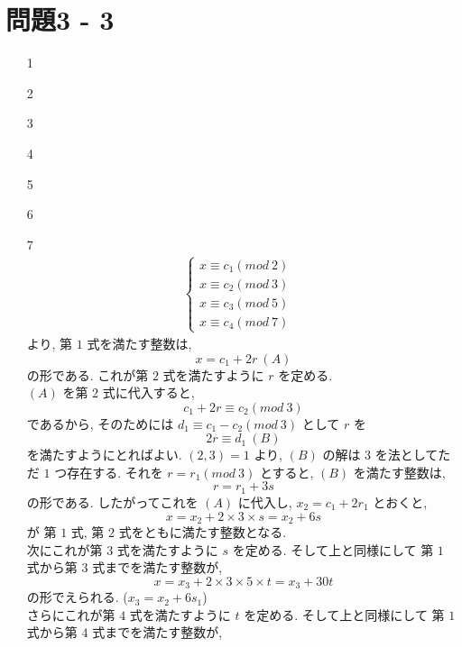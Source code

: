 \documentclass[12pt,a4paper]{jsarticle}
\begin{document}
\section*{問題3 - 3}
\begin{enumerate}
 \item[1]  \mbox{} \\
 \item[2]  \mbox{} \\
 \item[3]  \mbox{} \\
 \item[4]  \mbox{} \\
 \item[5]  \mbox{} \\
 \item[6]  \mbox{} \\
 \item[7]  \mbox{} \\
 \begin{align*}
  \begin{cases}
  x \equiv c_1 (mod~2) & \\
  x \equiv c_2 (mod~3) & \\
  x \equiv c_3 (mod~5) & \\
  x \equiv c_4 (mod~7)
  \end{cases}
 \end{align*}
 より, 第 $1$ 式を満たす整数は,
 \[ x = c_1 + 2r~ (A) \]
 の形である. これが第 $2$ 式を満たすように $r$ を定める. \\
 $(A)$ を第 $2$ 式に代入すると,
 \[ c_1 + 2r \equiv c_2 (mod~3) \] 
 であるから, そのためには $d_1 \equiv c_1 - c_2 (mod~3)$ として $r$ を
 \[ 2r \equiv d_1~ (B) \]
 を満たすようにとればよい. $(2, 3) = 1$ より, $(B)$ の解は $3$ を法としてただ $1$ つ存在する. それを $r = r_1 (mod~3)$ とすると, $(B)$ を満たす整数は,
 \[ r = r_1 + 3s \]
 の形である. したがってこれを $(A)$ に代入し, $x_2 = c_1 + 2r_1$ とおくと,
 \[ x = x_2 + 2 \times 3 \times s = x_2 + 6s \]
 が 第 $1$ 式, 第 $2$ 式をともに満たす整数となる. \\
 次にこれが第 $3$ 式を満たすように $s$ を定める. そして上と同様にして 第 $1$ 式から第 $3$ 式までを満たす整数が, 
 \[ x = x_3 + 2 \times 3 \times 5 \times t = x_3 + 30t \] 
 の形でえられる. ($x_3 = x_2 + 6s_1$)\\
 さらにこれが第 $4$ 式を満たすように $t$ を定める. そして上と同様にして 第 $1$ 式から第 $4$ 式までを満たす整数が, 

\end{enumerate}
\end{document}
